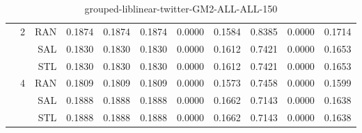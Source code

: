 \begin{center}
\begin{table}[htbp]
\begin{tabular}{ | r | r | r | r | r | r | r | r | r | r | r |}
 & \multirow{3}{*}{2} & RAN & 0.1874 & 0.1874 & 0.1874 & 0.0000 & 0.1584 & 0.8385 & 0.0000 & 0.1714\\ \cline{3-11}
 &   & SAL & 0.1830 & 0.1830 & 0.1830 & 0.0000 & 0.1612 & 0.7421 & 0.0000 & 0.1653\\ \cline{3-11}
 &   & STL & 0.1830 & 0.1830 & 0.1830 & 0.0000 & 0.1612 & 0.7421 & 0.0000 & 0.1653\\ \cline{2-11}
 & \multirow{3}{*}{4} & RAN & 0.1809 & 0.1809 & 0.1809 & 0.0000 & 0.1573 & 0.7458 & 0.0000 & 0.1599\\ \cline{3-11}
 &   & SAL & 0.1888 & 0.1888 & 0.1888 & 0.0000 & 0.1662 & 0.7143 & 0.0000 & 0.1638\\ \cline{3-11}
 &   & STL & 0.1888 & 0.1888 & 0.1888 & 0.0000 & 0.1662 & 0.7143 & 0.0000 & 0.1638\\ \cline{2-11}
\hline
\end{tabular}
\caption{grouped-liblinear-twitter-GM2-ALL-ALL-150}
\end{table}
\end{center}

